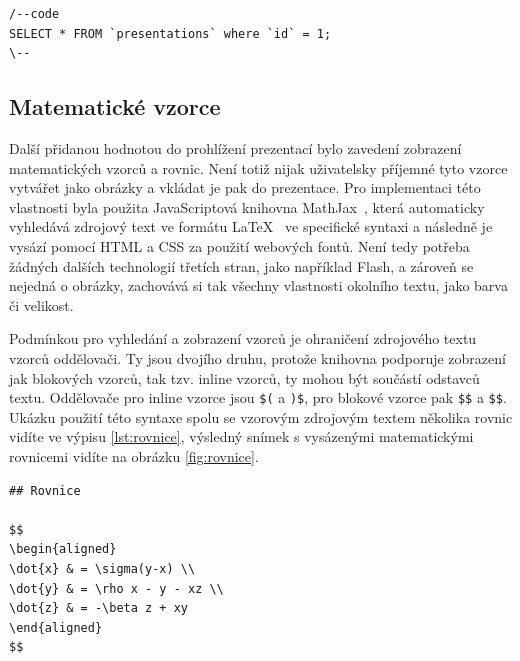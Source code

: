 \documentclass[11pt,twoside,a4paper]{book}
\begin{document}
\begin{lstlisting}[caption={Ukázka blokové syntaxe pro výpis kódu},label={lst:code}]
/--code
SELECT * FROM `presentations` where `id` = 1;
\--
\end{lstlisting}


\subsection{Matematické vzorce}
Další přidanou hodnotou do prohlížení prezentací bylo zavedení zobrazení matematických vzorců a rovnic. Není totiž nijak uživatelsky příjemné tyto vzorce vytvářet jako obrázky a vkládat je pak do prezentace. Pro implementaci této vlastnosti byla použita JavaScriptová knihovna MathJax~\cite{mathjax}, která automaticky vyhledává zdrojový text ve formátu \LaTeX~\cite{latex} ve specifické syntaxi a následně je vysází pomocí HTML a CSS za použití webových fontů. Není tedy potřeba žádných dalších technologií třetích stran, jako například Flash, a zároveň se nejedná o obrázky, zachovává si tak všechny vlastnosti okolního textu, jako barva či velikost.

Podmínkou pro vyhledání a zobrazení vzorců je ohraničení zdrojového textu vzorců oddělovači. Ty jsou dvojího druhu, protože knihovna podporuje zobrazení jak blokových vzorců, tak tzv. inline vzorců, ty mohou být součástí odstavců textu. Oddělovače pro inline vzorce jsou \verb|$(| a \verb|)$|, pro blokové vzorce pak \verb|$$| a \verb|$$|. Ukázku použití této syntaxe spolu se vzorovým zdrojovým textem několika rovnic vidíte ve výpisu \ref{lst:rovnice}, výsledný snímek s vysázenými matematickými rovnicemi vidíte na obrázku \ref{fig:rovnice}.

\begin{lstlisting}[caption={Ukázka syntaxe matematických vzorců},label={lst:rovnice}]
## Rovnice

$$
\begin{aligned}
\dot{x} & = \sigma(y-x) \\
\dot{y} & = \rho x - y - xz \\
\dot{z} & = -\beta z + xy
\end{aligned}
$$
\end{lstlisting}
\end{document}
